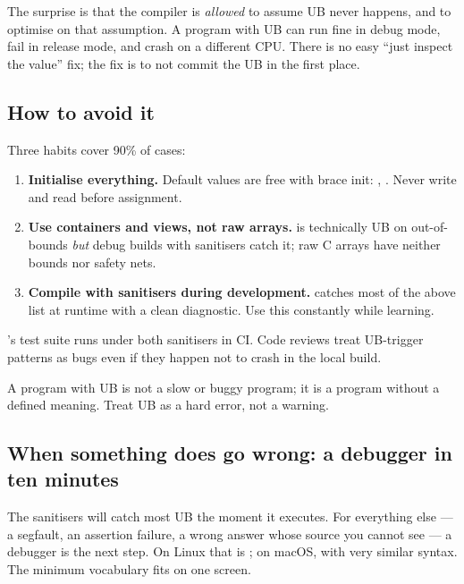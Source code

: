 The surprise is that the compiler is \emph{allowed} to assume UB
never happens, and to optimise on that assumption. A program with
UB can run fine in debug mode, fail in release mode, and crash on a
different CPU. There is no easy ``just inspect the value'' fix; the
fix is to not commit the UB in the first place.

\subsection{How to avoid it}

Three habits cover 90\% of cases:

\begin{enumerate}[leftmargin=*]
  \item \textbf{Initialise everything.} Default values are free with
    brace init: , . Never write
     and read  before assignment.
  \item \textbf{Use containers and views, not raw arrays.}
     is technically UB on out-of-bounds
    \emph{but} debug builds with sanitisers catch it; raw C arrays
    have neither bounds nor safety nets.
  \item \textbf{Compile with sanitisers during development.}
     catches most of the above
    list at runtime with a clean diagnostic. Use this constantly
    while learning.
\end{enumerate}

\maya{}'s test suite runs under both sanitisers in CI. Code reviews
treat UB-trigger patterns as bugs even if they happen not to crash
in the local build.

\begin{warning}
A program with UB is not a slow or buggy program; it is a program
without a defined meaning. Treat UB as a hard error, not a warning.
\end{warning}

\subsection{When something does go wrong: a debugger in ten minutes}

The sanitisers will catch most UB the moment it executes. For
everything else --- a segfault, an assertion failure, a wrong answer
whose source you cannot see --- a debugger is the next step. On
Linux that is ; on macOS,  with very similar
syntax. The minimum vocabulary fits on one screen.

